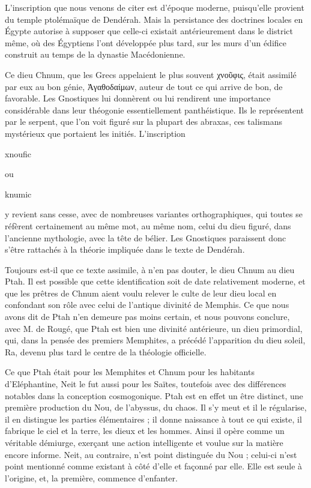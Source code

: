 \documentclass[a4paper, 11pt, oneside]{article}
\begin{document}
L'inscription que nous venons de citer est d'époque moderne, puisqu'elle provient du temple ptolémaïque de Dendérah. Mais la persistance des doctrines locales en Égypte autorise à supposer que celle-ci existait antérieurement dans le district même, où des Égyptiens l'ont développée plus tard, sur les murs d'un édifice construit au temps de la dynastie Macédonienne.

Ce dieu Chnum, que les Grecs appelaient le plus souvent χνοῦφις, était assimilé par eux au bon génie, Ἀγαθοδαίμων, auteur de tout ce qui arrive de bon, de favorable. Les Gnostiques lui donnèrent ou lui rendirent une importance considérable dans leur théogonie essentiellement panthéistique. Ils le représentent par le serpent, que l'on voit figuré sur la plupart des abraxas, ces talismans mystérieux que portaient les initiés. L'inscription \begin{coptic}xnoufic\end{coptic} ou \begin{coptic}knumic\end{coptic} y revient sans cesse, avec de nombreuses variantes orthographiques, qui toutes se réfèrent certainement au même mot, au même nom, celui du dieu figuré, dans l'ancienne mythologie, avec la tête de bélier. Les Gnostiques paraissent donc s'être rattachés à la théorie impliquée dans le texte de Dendérah.

Toujours est-il que ce texte assimile, à n'en pas douter, le dieu Chnum au dieu Ptah. Il est possible que cette identification soit de date relativement moderne, et que les prêtres de Chnum aient voulu relever le culte de leur dieu local en confondant son rôle avec celui de l'antique divinité de Memphis. Ce que nous avons dit de Ptah n'en demeure pas moins certain, et nous pouvons conclure, avec M. de Rougé, que Ptah est bien une divinité antérieure, un dieu primordial, qui, dans la pensée des premiers Memphites, a précédé l'apparition du dieu soleil, Ra, devenu plus tard le centre de la théologie officielle.

Ce que Ptah était pour les Memphites et Chnum pour les habitants d'Eléphantine, Neit le fut aussi pour les Saïtes, toutefois avec des différences notables dans la conception cosmogonique. Ptah est en effet un être distinct, une première production du Nou, de l'abyssus, du chaos. Il s'y meut et il le régularise, il en distingue les parties élémentaires ; il donne naissance à tout ce qui existe, il fabrique le ciel et la terre, les dieux et les hommes. Ainsi il opère comme un véritable démiurge, exerçant une action intelligente et voulue sur la matière encore informe. Neit, au contraire, n'est point distinguée du Nou ; celui-ci n'est point mentionné comme existant à côté d'elle et façonné par elle. Elle est seule à l'origine, et, la première, commence d'enfanter.
\end{document}
